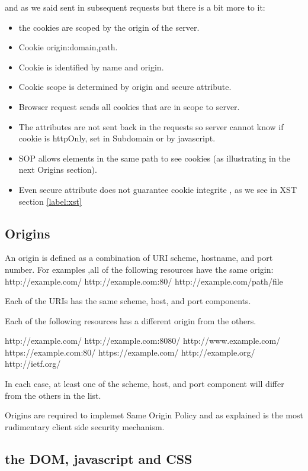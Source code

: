 and as we said sent in subsequent requests but there is a bit more to it:
\begin{itemize}
 \item the cookies are scoped by the origin of the server.\
 \item Cookie origin:domain,path.\
 \item Cookie is identified by name and origin.\
 \item Cookie  scope is	determined  by origin and secure attribute.\
 \item Browser request sends all cookies that are in scope to server.\
 \item The attributes are not sent back in the requests so server cannot know if cookie is httpOnly, set in Subdomain or by javascript.\
 \item SOP allows elements in the same path to see cookies (as illustrating in the next Origins section).\
 \item Even secure attribute does not guarantee cookie integrite , as we see in XST section \ref{label:xst} 
\end{itemize}

\subsection{Origins}

An origin is defined as a combination of URI scheme, hostname, and port number.
For examples ,all of the following resources have the same origin:
   http://example.com/
   http://example.com:80/
   http://example.com/path/file

   Each of the URIs has the same scheme, host, and port components.

   Each of the following resources has a different origin from the
   others.

   http://example.com/
   http://example.com:8080/
   http://www.example.com/
   https://example.com:80/
   https://example.com/
   http://example.org/
   http://ietf.org/

   In each case, at least one of the scheme, host, and port component
   will differ from the others in the list.

Origins are required to implemet Same Origin Policy and as explained is the most rudimentary client side security mechanism.
 
\subsection{the DOM, javascript and CSS}

